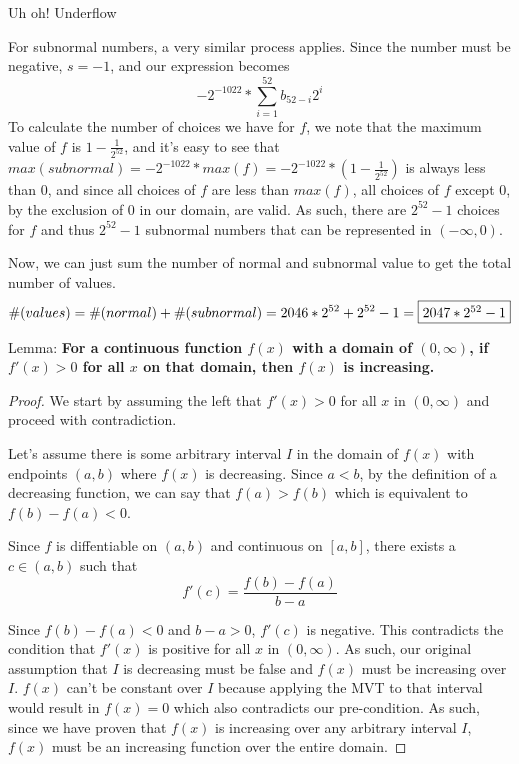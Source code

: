 \documentclass[11pt, nopagenumbers]{adamblan-hw}
\begin{document}
\begin{question}{Uh oh! Underflow}
\begin{part}
For subnormal numbers, a very similar process applies. Since the number must be negative, $s = -1$,
and our expression becomes $$-2^{-1022} * \sum\limits_{i=1}^{52}{b_{52-i}2^i}$$ To calculate
the number of choices we have for $f$, we note that the maximum value of $f$ is $1 - \frac{1}{2^{52}}$, 
and it's easy to see that $max(subnormal) = -2^{-1022} * max(f) = -2^{-1022} * (1 - \frac{1}{2^{52}})$ is always less than $0$, 
and since all choices of $f$ are less than $max(f)$, all choices of $f$ except $0$, by the exclusion of $0$
in our domain, are valid. As such, there are $2^{52} - 1$ choices for $f$ and thus 
$2^{52} - 1$ subnormal numbers that can be represented in $(-\infty, 0)$. 

Now, we can just sum the number of normal and subnormal value to get the total number of values.
$$\#(values) = \#(normal) + \#(subnormal) = 2046 * 2^{52} + 2^{52} - 1 = \fbox{$2047*2^{52} - 1$}$$
\end{part}

\pagebreak
\begin{part}
Lemma: \textbf{For a continuous function $f(x)$ with a domain of $(0, \infty)$, if $f'(x) > 0$ for all $x$ on that domain,
then $f(x)$ is increasing.}

\begin{proof}
We start by assuming the left that $f'(x) > 0$ for all $x$ in $(0, \infty)$ and proceed with contradiction.

Let's assume there is some arbitrary interval $I$ in the domain of $f(x)$ with endpoints $(a, b)$ where 
$f(x)$ is decreasing. Since $a < b$, by the definition of a decreasing function, we can say that
$f(a) > f(b)$ which is equivalent to $f(b) - f(a) < 0$. 

Since $f$ is diffentiable on $(a, b)$ and continuous on $[a, b]$, there exists a $c \in (a, b)$ such that
$$f'(c) = \frac{f(b) - f(a)}{b - a}$$

Since $f(b) - f(a) < 0$ and $b - a > 0$, $f'(c)$ is negative. This contradicts the condition
that $f'(x)$ is positive for all $x$ in $(0, \infty)$. As such, our original assumption that $I$ is decreasing
must be false and $f(x)$ must be increasing over $I$. $f(x)$ can't be constant over $I$ because
applying the MVT to that interval would result in $f(x)=0$ which also contradicts our pre-condition.
As such, since we have proven that $f(x)$ is increasing 
over any arbitrary interval $I$, $f(x)$ must be an increasing function over the entire domain.
\end{proof}


\end{part}
\end{question}
\end{document}
